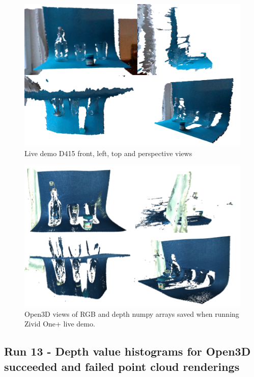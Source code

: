 \begin{figure}[h!]
\centering
\includegraphics[width=\textwidth]{Figures/D415LiveDemoIsometric.png}
\caption{Live demo D415 front, left, top and perspective views}
\label{fig:D415LiveDemoIsometric}
\end{figure}

\begin{figure}[h!]
\centering
\includegraphics[width=\textwidth]{Figures/ZividoLiveDemoIsometric_1.png}
\caption{Open3D views of RGB and depth numpy arrays saved when running Zivid One+ live demo.}
\label{fig:ZividoLiveDemoIsometric_1}
\end{figure}

\subsection{Run 13 - Depth value histograms for Open3D succeeded and failed point cloud renderings}
\label{app_res:13}

